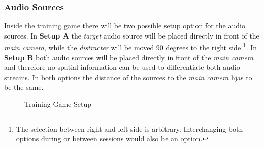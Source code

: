 \documentclass[a4paper,11pt]{article}%
\renewcommand{\\}{\vspace*{0.5\baselineskip} \newline}
\begin{document}
\subsubsection{Audio Sources}
Inside the training game there will be two possible setup option for the audio sources. In \textbf{Setup A} the \textit{target} audio source will be placed directly in front of the \textit{main camera}, while the \textit{distracter} will be moved 90 degrees to the right side \footnote{The selection between right and left side is arbitrary. Interchanging both options during or between sessions would also be an option.}. In \textbf{Setup B} both audio sources will be placed directly in front of the \textit{main camera} and therefore no spatial information can be used to differentiate both audio streams. In both options the distance of the sources to the \textit{main camera} hjas to be the same.
\begin{figure}[h!]
	\hspace{0.1\textwidth}
\caption{Training Game Setup}
\label{fig:setups}
\vspace{3mm}
\end{figure}
\newline
\newline
\end{document}
